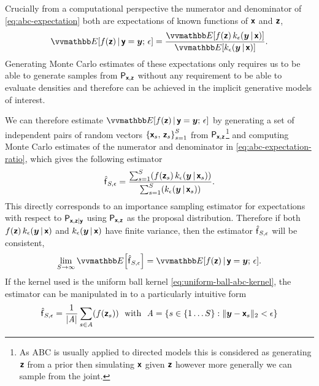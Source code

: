 Crucially from a computational perspective the numerator and denominator of \eqref{eq:abc-expectation} both are expectations of known functions of $\boldsymbol{\mathsf{x}}$ and $\boldsymbol{\mathsf{z}}$,
\begin{equation}
  \label{eq:abc-expectation-ratio}
  \expc{f(\rvct{z}) \gvn \rvct{y} = \vct{y};\,\epsilon} 
  =
  \frac{
    \expc{f(\rvct{z})\,k_{\epsilon}(\vct{y}\gvn\rvct{x})}
  }
  {
    \expc{k_\epsilon(\vct{y}\gvn\rvct{x})}
  }.
\end{equation}
Generating Monte Carlo estimates of these expectations only requires us to be able to generate samples from $\mathsf{P}_{\boldsymbol{\mathsf{x}},\boldsymbol{\mathsf{z}}}$ without any requirement to be able to evaluate densities and therefore can be achieved in the implicit generative models of interest. 

We can therefore estimate $\expc{f(\rvct{z}) \gvn \rvct{y} = \vct{y};\,\epsilon}$ by generating a set of independent pairs of random vectors $\lbr \rvct{x}_s,\,\rvct{z}_s \rbr_{s=1}^S$ from $\mathsf{P}_{\boldsymbol{\mathsf{x}},\boldsymbol{\mathsf{z}}}$\footnote{As \ac{ABC} is usually applied to directed models this is considered as generating $\boldsymbol{\mathsf{z}}$ from a prior then simulating $\boldsymbol{\mathsf{x}}$ given $\boldsymbol{\mathsf{z}}$ however more generally we can sample from the joint.} and computing Monte Carlo estimates of the numerator and denominator in \eqref{eq:abc-expectation-ratio}, which gives the following estimator
\begin{equation}\label{eq:abc-kernel-estimator}
  \hatf_{S,\epsilon} =
  \frac{
  \sum_{s=1}^S \lpa 
    f\lpa\rvct{z}_s\rpa \, 
    k_\epsilon\lpa\vct{y}\gvn\rvct{x}_s\rpa 
  \rpa
  }
  {
  \sum_{s=1}^S \lpa 
    k_\epsilon\lpa\vct{y}\gvn\rvct{x}_s\rpa 
  \rpa
  }.
\end{equation}
This directly corresponds to an importance sampling estimator for expectations with respect to $\mathsf{P}_{\boldsymbol{\mathsf{x}},\boldsymbol{\mathsf{z}}|\boldsymbol{\mathsf{y}}}$ using $\mathsf{P}_{\boldsymbol{\mathsf{x}},\boldsymbol{\mathsf{z}}}$ as the proposal distribution. Therefore if both $f(\boldsymbol{\mathsf{z}})\,k_{\epsilon}(\boldsymbol{y}\operatorname{|}\boldsymbol{\mathsf{x}})$ and $k_{\epsilon}(\boldsymbol{y}\operatorname{|}\boldsymbol{\mathsf{x}})$ have finite variance, then the estimator $\hatf_{S,\epsilon}$ will be consistent,
\begin{equation}
  \lim_{S\to \infty} \expc{\hatf_{S,\epsilon}} = \expc{f(\rvct{z}) \gvn \rvct{y} = \vct{y};\,\epsilon}.
\end{equation}
If the kernel used is the uniform ball kernel \eqref{eq:uniform-ball-abc-kernel}, the estimator can be manipulated in to a particularly intuitive form
\begin{equation}\label{eq:abc-reject-estimator}
  \hatf_{S,\epsilon} =
  \frac{1}{|\set{A}|}
  \sum_{s\in\set{A}} \lpa 
    f\lpa\rvct{z}_s\rpa
  \rpa
  ~~
  \textrm{with}
  ~~
  \set{A} = \lbr s \in \lbrace 1 \dots S \rbrace : \Vert \vct{y} - \rvct{x}_s \Vert_2 < \epsilon \rbr
\end{equation}
